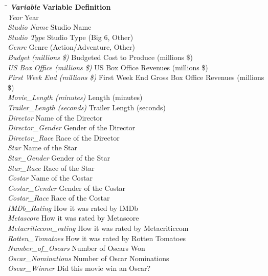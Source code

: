\begin{tabbing}
\hspace*{2in}\=\kill
\textbf{\emph{Variable}}\> \textbf{Variable Definition}\\
\emph{Year}\> Year\\
\emph{Studio Name}\> Studio Name\\
\emph{Studio Type}\> Studio Type (Big 6, Other)\\
\emph{Genre }\> Genre (Action/Adventure, Other)\\
\emph{Budget (millions \$)}\> Budgeted Cost to Produce (millions \$)\\
\emph{US Box Office (millions \$) }\> US Box Office Revenues (millions
\$)\\
\emph{First Week End (millions \$)}\> First Week End Gross Box Office
Revenues (millions \$)\\
\emph{Movie\_Length (minutes)}\> Length (minutes)\\
\emph{Trailer\_Length (seconds)}\> Trailer Length (seconds)\\
\emph{Director}\> Name of the Director\\
\emph{Director\_Gender}\> Gender of the Director\\
\emph{Director\_Race}\> Race of the Director\\
\emph{Star}\> Name of the Star\\
\emph{Star\_Gender}\> Gender of the Star\\
\emph{Star\_Race }\> Race of the Star\\
\emph{Costar}\> Name of the Costar\\
\emph{Costar\_Gender }\> Gender of the Costar\\
\emph{Costar\_Race}\> Race of the Costar\\
\emph{IMDb\_Rating}\> How it was rated by IMDb\\
\emph{Metascore}\> How it was rated by Metascore\\
\emph{Metacriticcom\_rating}\> How it was rated by Metacriticcom\\
\emph{Rotten\_Tomatoes}\> How it was rated by Rotten Tomatoes\\
\emph{Number\_of\_Oscars}\> Number of Oscars Won\\
\emph{Oscar\_Nominations}\> Number of Oscar Nominations\\
\emph{Oscar\_Winner}\> Did this movie win an Oscar?\\
\end{tabbing}

